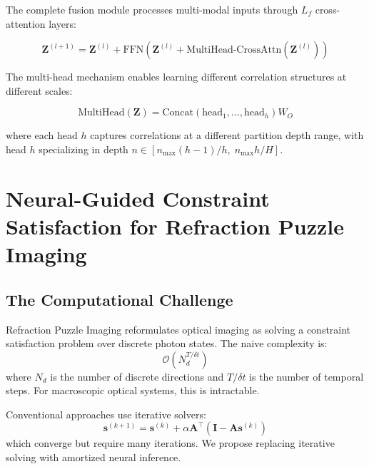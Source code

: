 \documentclass[11pt,a4paper]{article}
\theoremstyle{definition}
\theoremstyle{remark}
\begin{document}
The complete fusion module processes multi-modal inputs through $L_f$ cross-attention layers:

\begin{equation}
\mathbf{Z}^{(l+1)} = \mathbf{Z}^{(l)} + \text{FFN}\left(\mathbf{Z}^{(l)} + \text{MultiHead-CrossAttn}(\mathbf{Z}^{(l)})\right)
\end{equation}

The multi-head mechanism enables learning different correlation structures at different scales:

\begin{equation}
\text{MultiHead}(\mathbf{Z}) = \text{Concat}(\text{head}_1, \ldots, \text{head}_h) W_O
\end{equation}

where each head $h$ captures correlations at a different partition depth range, with head $h$ specializing in depth $n \in [n_{\max}(h-1)/h, \; n_{\max} h/H]$.

\section{Neural-Guided Constraint Satisfaction for Refraction Puzzle Imaging}
\label{sec:csp}

\subsection{The Computational Challenge}

Refraction Puzzle Imaging reformulates optical imaging as solving a constraint satisfaction problem over discrete photon states. The naive complexity is:
\begin{equation}
\mathcal{O}(N_d^{T/\delta t})
\end{equation}
where $N_d$ is the number of discrete directions and $T/\delta t$ is the number of temporal steps. For macroscopic optical systems, this is intractable.

Conventional approaches use iterative solvers:
\begin{equation}
\mathbf{s}^{(k+1)} = \mathbf{s}^{(k)} + \alpha \mathbf{A}^\top(\mathbf{I} - \mathbf{A}\mathbf{s}^{(k)})
\end{equation}
which converge but require many iterations. We propose replacing iterative solving with amortized neural inference.
\end{document}
